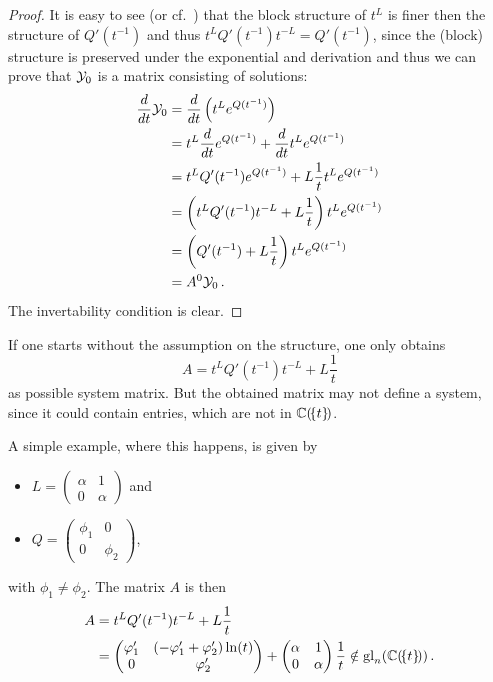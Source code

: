 \begin{proof}
  It is easy to see (or cf.~\cite[Appendix C.1]{Balser2000Formal}) that the
  block structure of $t^L$ is finer then the structure of $Q'(t^{-1})$ and thus
  $t^LQ'(t^{-1})t^{-L}=Q'(t^{-1})$, since the (block) structure is preserved
  under the exponential and derivation and thus we can prove that $\mathcal{Y}_0$ is a
  matrix consisting of solutions:
  \begin{align*}
    \frac{d}{dt}\mathcal{Y}_0
    &=\frac{d}{dt}\left(t^Le^{Q(t^{-1})}\right)
  \\&= t^L\frac{d}{dt}e^{Q(t^{-1})} + \frac{d}{dt}t^Le^{Q(t^{-1})}
  \\&= t^LQ'(t^{-1})e^{Q(t^{-1})} + L\frac{1}{t}t^Le^{Q(t^{-1})}
  \\&=\left(t^LQ'(t^{-1})t^{-L}+L\frac{1}{t}\right)t^Le^{Q(t^{-1})}
  \\&=\left(Q'(t^{-1})+L\frac{1}{t}\right)t^Le^{Q(t^{-1})}
  \\&=A^0\mathcal{Y}_0 \,.
  \end{align*}
  The invertability condition is clear.
\end{proof}
\begin{rem}
  If one starts without the assumption on the structure, one only obtains
  \[
    A=t^LQ'(t^{-1})t^{-L}+L\frac{1}{t}
  \]
  as possible system matrix. But the obtained matrix may not define a system,
  since it could contain entries, which are not in $\mathbb{C}(\!\{t\}\!)$.

  A simple example, where this happens, is given by
  \begin{itemize}
  \item $L=\begin{pmatrix} \alpha & 1 \\ 0 & \alpha \end{pmatrix}$ and
  \item $Q=\begin{pmatrix} \phi_1 & 0 \\ 0 & \phi_2 \end{pmatrix}$,
  \end{itemize}
  with $\phi_1\neq\phi_2$.
  The matrix $A$ is then
  \begin{align*}
    A  &=t^LQ'(t^{-1})t^{-L}+L\frac{1}{t}
    \\ &=
    \begin{pmatrix}
      \varphi_1' & (-\varphi_1'+\varphi_2')\ln(t)
      \\0     & \varphi_2'
    \end{pmatrix}
    +
    \begin{pmatrix}
        \alpha & 1
        \\ 0   & \alpha
    \end{pmatrix} \frac{1}{t}
    \notin\operatorname{gl}_n(\mathbb{C}(\!\{t\}\!))
    \,.
  \end{align*}
\end{rem}
